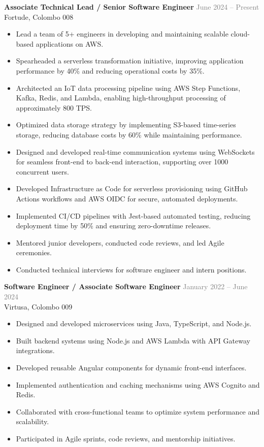 \documentclass[11pt,a4paper]{article}
\begin{document}
\textbf{Associate Technical Lead / Senior Software Engineer} \hfill \textcolor{graytext}{June 2024 -- Present} \\
Fortude, Colombo 008
\begin{itemize}[leftmargin=1.2em]
  \item Lead a team of 5+ engineers in developing and maintaining scalable cloud-based applications on AWS.
  \item Spearheaded a serverless transformation initiative, improving application performance by 40\% and reducing operational costs by 35\%.
  \item Architected an IoT data processing pipeline using AWS Step Functions, Kafka, Redis, and Lambda, enabling high-throughput processing of approximately 800 TPS.
  \item Optimized data storage strategy by implementing S3-based time-series storage, reducing database costs by 60\% while maintaining performance.
  \item Designed and developed real-time communication systems using WebSockets for seamless front-end to back-end interaction, supporting over 1000 concurrent users.
  \item Developed Infrastructure as Code for serverless provisioning using GitHub Actions workflows and AWS OIDC for secure, automated deployments.
  \item Implemented CI/CD pipelines with Jest-based automated testing, reducing deployment time by 50\% and ensuring zero-downtime releases.
  \item Mentored junior developers, conducted code reviews, and led Agile ceremonies.
  \item Conducted technical interviews for software engineer and intern positions.
\end{itemize}

\textbf{Software Engineer / Associate Software Engineer} \hfill \textcolor{graytext}{January 2022 -- June 2024} \\
Virtusa, Colombo 009
\begin{itemize}[leftmargin=1.2em]
  \item Designed and developed microservices using Java, TypeScript, and Node.js.
  \item Built backend systems using Node.js and AWS Lambda with API Gateway integrations.
  \item Developed reusable Angular components for dynamic front-end interfaces.
  \item Implemented authentication and caching mechanisms using AWS Cognito and Redis.
  \item Collaborated with cross-functional teams to optimize system performance and scalability.
  \item Participated in Agile sprints, code reviews, and mentorship initiatives.
\end{itemize}
\end{document}
